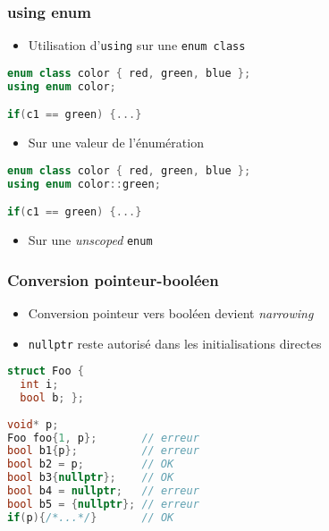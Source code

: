 \documentclass[C++.tex]{subfiles}
\begin{document}
\begin{frame}[fragile]
	\frametitle{using enum}
	\begin{itemize}
		\item Utilisation d'\lstinline|using| sur une \lstinline|enum class|
	\end{itemize}

	\begin{lstlisting}[language=C++]
enum class color { red, green, blue };
using enum color;

if(c1 == green) {...} \end{lstlisting}

	\begin{itemize}
		\item Sur une valeur de l'énumération
	\end{itemize}

	\begin{lstlisting}[language=C++]
enum class color { red, green, blue };
using enum color::green;

if(c1 == green) {...}\end{lstlisting}

	\begin{itemize}
		\item Sur une \textit{unscoped} \lstinline|enum|
	\end{itemize}
\end{frame}

\begin{frame}[fragile]
	\frametitle{Conversion pointeur-booléen}
	\begin{itemize}
		\item Conversion pointeur vers booléen devient \textit{narrowing}
		

		\item \lstinline|nullptr| reste autorisé dans les initialisations directes
	\end{itemize}
		
	\begin{lstlisting}[language=C++]
struct Foo {
  int i;
  bool b; };
		
void* p;
Foo foo{1, p};       // erreur
bool b1{p};          // erreur
bool b2 = p;         // OK
bool b3{nullptr};    // OK
bool b4 = nullptr;   // erreur
bool b5 = {nullptr}; // erreur
if(p){/*...*/}       // OK\end{lstlisting}

\end{frame}
\end{document}
